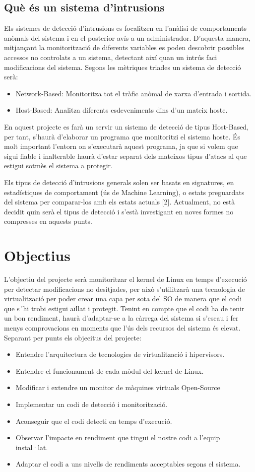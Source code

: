 ﻿\documentclass[10pt,a4paper,twocolumn,twoside]{article}
\begin{document}
\subsection{Què és un sistema d'intrusions}
Els sistemes de detecció d’intrusions es focalitzen en l’anàlisi de comportaments anòmals del sistema i en el posterior avís a un administrador. D’aquesta manera, mitjançant la monitorització de diferents variables es poden descobrir possibles accessos no controlats a un sistema, detectant així quan un intrús faci modificacions del sistema.
Segons les mètriques triades un sistema de detecció serà:
\begin{itemize}
\item Network-Based: Monitoritza tot el tràfic anòmal de xarxa d’entrada i sortida.
\item Host-Based: Analitza diferents esdeveniments dins d’un mateix hoste.
\end{itemize}
En aquest projecte es farà un servir un sistema de detecció de tipus Host-Based, per tant, s’haurà d’elaborar un programa que monitoritzi el sistema hoste. És molt important l’entorn on s’executarà aquest programa, ja que si volem que sigui fiable i inalterable haurà d’estar separat dels mateixos tipus d’atacs al que estigui sotmès el sistema a protegir.

Els tipus de detecció d’intrusions generals solen ser basats en signatures, en estadístiques de comportament (ús de Machine Learning), o estats preguardats del sistema per comparar-los amb els estats actuals [2]. Actualment, no està decidit quin serà el tipus de detecció i s’està investigant en noves formes no compresses en aquests punts.

\section{Objectius}
L'objectiu del projecte serà monitoritzar el kernel de Linux en temps d'execució per detectar modificacions no desitjades, per això s'utilitzarà una tecnologia de virtualització per poder crear una capa per sota del SO de manera que el codi que s´hi trobi estigui aïllat i protegit. Tenint en compte que el codi ha de tenir un bon rendiment, haurà d'adaptar-se a la càrrega del sistema si s'escau i fer menys comprovacions en moments que l'ús dels recursos del sistema és elevat. Separant per punts els objecitus del projecte:
\begin{itemize}
\item Entendre l’arquitectura de tecnologies de virtualització i hipervisors.
\item Entendre el funcionament de cada mòdul del kernel de Linux.
\item Modificar i extendre un monitor de màquines virtuals Open-Source
\item Implementar un codi de detecció i monitorització.
\item Aconseguir que el codi detecti en temps d’execució.
\item Observar l’impacte en rendiment que tingui el nostre codi a l’equip instal·lat.
\item Adaptar el codi a uns nivells de rendiments acceptables segons el sistema.
\end{itemize}
\end{document}
